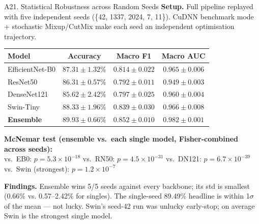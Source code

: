\documentclass[10pt, aspectratio=169]{beamer}
\begin{document}
\begin{frame}{A21. Statistical Robustness across Random Seeds}
    \scriptsize
    \textbf{Setup.} Full pipeline replayed with five independent seeds (\{42, 1337, 2024, 7, 11\}).
    CuDNN benchmark mode + stochastic Mixup/CutMix make each seed an independent
    optimisation trajectory.

    \vspace{0.15cm}
    \begin{table}[h]
    \centering
    \begin{tabular}{lccc}
    \toprule
    \textbf{Model} & \textbf{Accuracy} & \textbf{Macro F1} & \textbf{Macro AUC}\\
    \midrule
    EfficientNet-B0 & $87.31 \pm 1.32\%$ & $0.814 \pm 0.022$ & $0.965 \pm 0.006$\\
    ResNet50        & $86.31 \pm 0.57\%$ & $0.792 \pm 0.011$ & $0.949 \pm 0.003$\\
    DenseNet121     & $85.62 \pm 2.42\%$ & $0.797 \pm 0.025$ & $0.960 \pm 0.004$\\
    Swin-Tiny       & $\mathbf{88.33 \pm 1.96\%}$ & $0.839 \pm 0.030$ & $0.966 \pm 0.008$\\
    \midrule
    \rowcolor{usthlight}\textbf{Ensemble} & $\mathbf{89.93 \pm 0.66\%}$ & $\mathbf{0.852 \pm 0.010}$ & $\mathbf{0.982 \pm 0.001}$\\
    \bottomrule
    \end{tabular}
    \end{table}

    \vspace{0.15cm}
    \textbf{McNemar test (ensemble vs.\ each single model, Fisher-combined across seeds):}\\[2pt]
    vs.\ EB0: $p = 5.3{\times}10^{-18}$ \quad
    vs.\ RN50: $p = 4.5{\times}10^{-31}$ \quad
    vs.\ DN121: $p = 6.7{\times}10^{-39}$ \quad
    vs.\ Swin (strongest): $p = 1.2{\times}10^{-7}$

    \vspace{0.1cm}
    \textbf{Findings.} Ensemble wins 5/5 seeds against every backbone; its std
    is smallest (0.66\% vs. 0.57--2.42\% for singles). The single-seed 89.49\%
    headline is within 1$\sigma$ of the mean --- not lucky. Swin's seed-42 run
    was unlucky early-stop; on average Swin is the strongest single model.
\end{frame}
\end{document}
